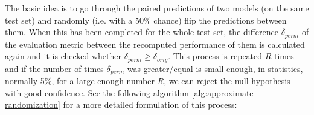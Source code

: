 






The basic idea is to go through the paired predictions of two models (on
the same test set) and
randomly (i.e. with a 50\% chance) flip the predictions between them. When
this has been completed for the whole test set, the difference $\delta_{perm}$ of the
evaluation metric between the recomputed performance of them is calculated again
and it is checked whether $\delta_{perm} \geq \delta_{orig}$. This process is repeated
$R$ times and if the number of times $\delta_{perm}$ was greater/equal is small
enough, in statistics, normally 5\%, for a large enough number $R$, we can reject
the null-hypothesis with good confidence. See the following algorithm \ref{alg:approximate-randomization}
for a more detailed formulation of this process:

